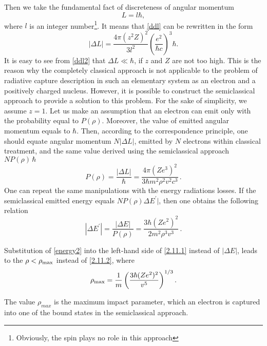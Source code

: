 \documentclass{SovJurn/JETPL}
\begin{document}
Then we take the fundamental fact of discreteness of angular momentum
\begin{equation}
L=l\hbar,
\label{q_ang_mom}
\end{equation}
where $l$ is an integer number\footnote{Obviously, the spin plays no role in this approach}. It means that \eqref{ddl} can be rewritten in the form
\begin{equation}
|\Delta L|=\frac{4\pi (z^2Z)^2}{3l^2}\left(\frac{e^2}{\hbar c}\right)^3\hbar.
\label{ddl2}
\end{equation}
It is easy to see from \eqref{ddl2} that $\Delta L \ll \hbar$, if $z$ and $Z$ are not too high. This is the reason why the completely classical approach is not applicable to the problem of radiative capture description in such an elementary system as an electron and a positively charged nucleus. However, it is possible to construct the semiclassical approach to provide a solution to this problem. For the sake of simplicity, we assume $z=1$.
Let us make an assumption that an electron can emit only with the probability equal to $P(\rho)$. Moreover, the value of emitted angular momentum equals to $\hbar$. Then, according to the correspondence principle, one should equate angular momentum $N|\Delta L|$, emitted by $N$ electrons within classical treatment, and the same value derived using the semiclassical approach $NP(\rho)\,\hbar$  
\begin{equation}
P(\rho)=\frac{|\Delta L|}{\hbar}=
\frac{4\pi(Ze^3)^2}{3\hbar m^2\rho^2v^2c^3}\,.
\label{probability2}
\end{equation}
One can repeat the same manipulations with the energy radiations losses. If the semiclassical emitted energy equals $NP(\rho)\Delta E^{\prime}|$, then one obtains the following relation
\begin{equation}
|\Delta E^{\prime}|=\frac{|\Delta E|}{P(\rho)}=
\frac{3\hbar (Ze^2)^2}{2m^2\rho^3v^3}\,.
\label{energy2}
\end{equation}
\par Substitution of \eqref{energy2} into the left-hand side of \eqref{2.11.1} instead of $|\Delta E|$, leads to the $\rho<\rho_{\rm max}$ instead of \eqref{2.11.2}, where
\begin{equation}
\rho_{\rm max}=\frac{1}{m}\left(\frac{3\hbar(Ze^2)^2}{v^5}\right)^{1/3}.
\label{rhomax}
\end{equation}
\par The value $\rho_{max}$ is the maximum impact parameter, which an electron is captured into one of the bound states in the semiclassical approach.
\end{document}
